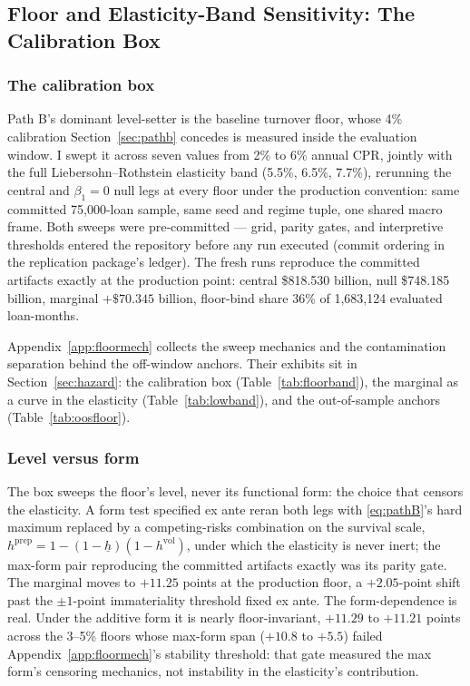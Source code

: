 \subsection{Floor and Elasticity-Band Sensitivity: The Calibration Box}\label{sec:robustness-floor}

\subsubsection{The calibration box}

Path B's dominant level-setter is the baseline turnover floor, whose 4\% calibration Section~\ref{sec:pathb} concedes is measured inside the evaluation window. I swept it across seven values from 2\% to 6\% annual CPR, jointly with the full Liebersohn--Rothstein elasticity band (5.5\%, 6.5\%, 7.7\%), rerunning the central and $\beta_1 = 0$ null legs at every floor under the production convention: same committed 75,000-loan sample, same seed and regime tuple, one shared macro frame. Both sweeps were pre-committed --- grid, parity gates, and interpretive thresholds entered the repository before any run executed (commit ordering in the replication package's ledger). The fresh runs reproduce the committed artifacts exactly at the production point: central \$818.530 billion, null \$748.185 billion, marginal $+\$70.345$ billion, floor-bind share 36\% of 1,683,124 evaluated loan-months.

Appendix~\ref{app:floormech} collects the sweep mechanics and the contamination separation behind the off-window anchors. Their exhibits sit in Section~\ref{sec:hazard}: the calibration box (Table~\ref{tab:floorband}), the marginal as a curve in the elasticity (Table~\ref{tab:lowband}), and the out-of-sample anchors (Table~\ref{tab:oosfloor}).

\subsubsection{Level versus form}

The box sweeps the floor's level, never its functional form: the choice that censors the elasticity. A form test specified ex ante reran both legs with \eqref{eq:pathB}'s hard maximum replaced by a competing-risks combination on the survival scale, $h^{\mathrm{prep}} = 1 - (1 - \underline{h})(1 - h^{\mathrm{vol}})$, under which the elasticity is never inert; the max-form pair reproducing the committed artifacts exactly was its parity gate. The marginal moves to $+11.25$ points at the production floor, a $+2.05$-point shift past the $\pm 1$-point immateriality threshold fixed ex ante. The form-dependence is real. Under the additive form it is nearly floor-invariant, $+11.29$ to $+11.21$ points across the 3--5\% floors whose max-form span ($+10.8$ to $+5.5$) failed Appendix~\ref{app:floormech}'s stability threshold: that gate measured the max form's censoring mechanics, not instability in the elasticity's contribution.

